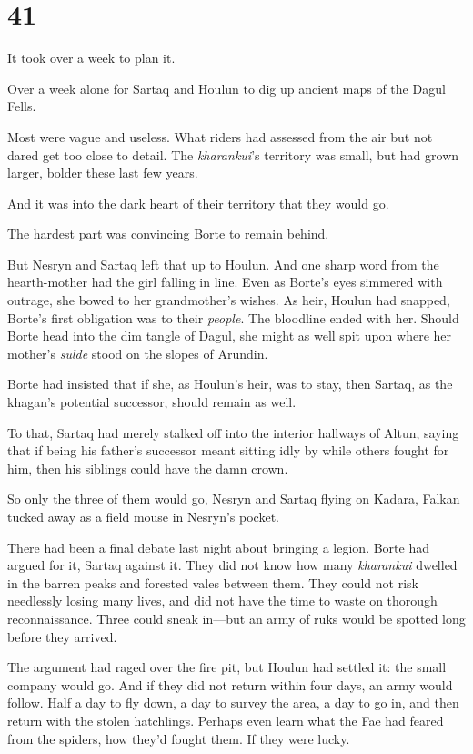 
\chapter{41}

It took over a week to plan it.

Over a week alone for Sartaq and Houlun to dig up ancient maps of the Dagul Fells.

Most were vague and useless.
What riders had assessed from the air but not dared get too close to detail.
The \emph{kharankui}'s territory was small, but had grown larger, bolder these last few years.

And it was into the dark heart of their territory that they would go.

The hardest part was convincing Borte to remain behind.

But Nesryn and Sartaq left that up to Houlun.
And one sharp word from the hearth-mother had the girl falling in line.
Even as Borte's eyes simmered with outrage, she bowed to her grandmother's wishes.
As heir, Houlun had snapped, Borte's first obligation was to their \emph{people}.
The bloodline ended with her.
Should Borte head into the dim tangle of Dagul, she might as well spit upon where her mother's \emph{sulde} stood on the slopes of Arundin.

Borte had insisted that if she, as Houlun's heir, was to stay, then Sartaq, as the khagan's potential successor, should remain as well.

To that, Sartaq had merely stalked off into the interior hallways of Altun, saying that if being his father's successor meant sitting idly by while others fought for him, then his siblings could have the damn crown.

So only the three of them would go, Nesryn and Sartaq flying on Kadara, Falkan tucked away as a field mouse in Nesryn's pocket.

There had been a final debate last night about bringing a legion.
Borte had argued for it, Sartaq against it.
They did not know how many \emph{kharankui} dwelled in the barren peaks and forested vales between them.
They could not risk needlessly losing many lives, and did not have the time to waste on thorough reconnaissance.
Three could sneak in---but an army of ruks would be spotted long before they arrived.

The argument had raged over the fire pit, but Houlun had settled it: the small company would go.
And if they did not return within four days, an army would follow.
Half a day to fly down, a day to survey the area, a day to go in, and then return with the stolen hatchlings.
Perhaps even learn what the Fae had feared from the spiders, how they'd fought them.
If they were lucky.

